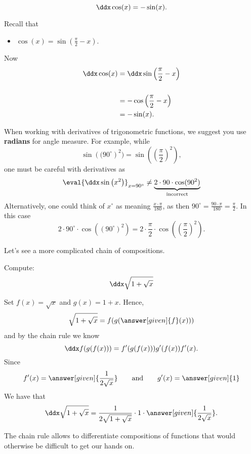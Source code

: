 \documentclass{ximera}
\begin{document}
\begin{theorem}
\[
\ddx \cos(x) = -\sin(x).
\]
\begin{explanation}
Recall that
\begin{itemize}
\item $\cos(x) = \sin\left(\frac{\pi}{2}-x\right)$.
\end{itemize}
Now
\begin{align*}
\ddx \cos(x) &= \ddx \sin\left(\frac{\pi}{2}-x\right)\\ \\
&=-\cos\left(\frac{\pi}{2}-x\right) \\
&= -\sin(x).
\end{align*}
\end{explanation}
\end{theorem}


\begin{warning}
When working with derivatives of trigonometric functions, we suggest
you use \textbf{radians} for angle measure. For example, while
\[
\sin\left((90^\circ\right)^2) = \sin\left(\left(\frac{\pi}{2}\right)^2\right),
\]
one must be careful with derivatives as
\[
\eval{\ddx \sin\left(x^2\right)}_{x=90^\circ} \ne \underbrace{2\cdot 90\cdot \cos(90^2)}_{\text{incorrect}}
\]
Alternatively, one could think of $x^\circ$ as meaning
$\frac{x\cdot\pi}{180}$, as then $90^\circ = \frac{90\cdot\pi}{180} =
\frac{\pi}{2}$. In this case
\[
2\cdot 90^\circ\cdot \cos((90^\circ)^2) = 2\cdot \frac{\pi}{2}\cdot\cos\left(\left(\frac{\pi}{2}\right)^2\right).
\]
\end{warning}

Let's see a more complicated chain of compositions.

\begin{example}
Compute:
\[
\ddx \sqrt{1+\sqrt{x}}
\]

\begin{explanation}
Set 
$f(x)=\sqrt{x}$ and $g(x)=1+x$. Hence,
\[
\sqrt{1+\sqrt{x}}=f(g(\answer[given]{f}(x)))
\]
and by the chain rule we know
\[
\ddx f(g(f(x))) = f'(g(f(x)))g'(f(x))f'(x).
\]
Since 
\[
f'(x) = \answer[given]{\frac{1}{2\sqrt{x}}} \qquad\text{and}\qquad g'(x) = \answer[given]{1}
\]
We have that
\[
\ddx \sqrt{1+\sqrt{x}} = \frac{1}{2\sqrt{1+\sqrt{x}}}\cdot 1\cdot  \answer[given]{\frac{1}{2\sqrt{x}}}.
\]
\end{explanation}
\end{example}

The chain rule allows to differentiate compositions of functions that
would otherwise be difficult to get our hands on.
\end{document}

